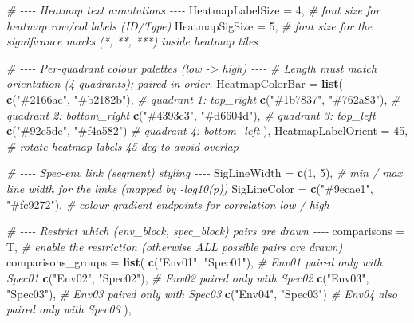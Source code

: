 \documentclass[
]{book}
\newenvironment{Shaded}{\begin{snugshade}}{\end{snugshade}}
\newcommand{\AttributeTok}[1]{\textcolor[rgb]{0.13,0.29,0.53}{#1}}
\newcommand{\CommentTok}[1]{\textcolor[rgb]{0.56,0.35,0.01}{\textit{#1}}}
\newcommand{\DecValTok}[1]{\textcolor[rgb]{0.00,0.00,0.81}{#1}}
\newcommand{\FunctionTok}[1]{\textcolor[rgb]{0.13,0.29,0.53}{\textbf{#1}}}
\newcommand{\NormalTok}[1]{#1}
\newcommand{\StringTok}[1]{\textcolor[rgb]{0.31,0.60,0.02}{#1}}
\begin{document}
\begin{Shaded}
\begin{Highlighting}[]
  \CommentTok{\# {-}{-}{-}{-} Heatmap text annotations {-}{-}{-}{-}}
  \AttributeTok{HeatmapLabelSize   =} \DecValTok{4}\NormalTok{,                    }\CommentTok{\# font size for heatmap row/col labels (ID/Type)}
  \AttributeTok{HeatmapSigSize     =} \DecValTok{5}\NormalTok{,                    }\CommentTok{\# font size for the significance marks (*, **, ***) inside heatmap tiles}

  \CommentTok{\# {-}{-}{-}{-} Per{-}quadrant colour palettes (low {-}\textgreater{} high) {-}{-}{-}{-}}
  \CommentTok{\# Length must match \textasciigrave{}orientation\textasciigrave{} (4 quadrants); paired in order.}
  \AttributeTok{HeatmapColorBar    =} \FunctionTok{list}\NormalTok{(}
    \FunctionTok{c}\NormalTok{(}\StringTok{"\#2166ac"}\NormalTok{, }\StringTok{"\#b2182b"}\NormalTok{),                 }\CommentTok{\# quadrant 1: top\_right}
    \FunctionTok{c}\NormalTok{(}\StringTok{"\#1b7837"}\NormalTok{, }\StringTok{"\#762a83"}\NormalTok{),                 }\CommentTok{\# quadrant 2: bottom\_right}
    \FunctionTok{c}\NormalTok{(}\StringTok{"\#4393c3"}\NormalTok{, }\StringTok{"\#d6604d"}\NormalTok{),                 }\CommentTok{\# quadrant 3: top\_left}
    \FunctionTok{c}\NormalTok{(}\StringTok{"\#92c5de"}\NormalTok{, }\StringTok{"\#f4a582"}\NormalTok{)                  }\CommentTok{\# quadrant 4: bottom\_left}
\NormalTok{  ),}
  \AttributeTok{HeatmapLabelOrient =} \DecValTok{45}\NormalTok{,                   }\CommentTok{\# rotate heatmap labels 45 deg to avoid overlap}

  \CommentTok{\# {-}{-}{-}{-} Spec{-}env link (segment) styling {-}{-}{-}{-}}
  \AttributeTok{SigLineWidth       =} \FunctionTok{c}\NormalTok{(}\DecValTok{1}\NormalTok{, }\DecValTok{5}\NormalTok{),              }\CommentTok{\# min / max line width for the links (mapped by {-}log10(p))}
  \AttributeTok{SigLineColor       =} \FunctionTok{c}\NormalTok{(}\StringTok{"\#9ecae1"}\NormalTok{, }\StringTok{"\#fc9272"}\NormalTok{),  }\CommentTok{\# colour gradient endpoints for correlation low / high}

  \CommentTok{\# {-}{-}{-}{-} Restrict which (env\_block, spec\_block) pairs are drawn {-}{-}{-}{-}}
  \AttributeTok{comparisons        =}\NormalTok{ T,                    }\CommentTok{\# enable the restriction (otherwise ALL possible pairs are drawn)}
  \AttributeTok{comparisons\_groups =} \FunctionTok{list}\NormalTok{(}
    \FunctionTok{c}\NormalTok{(}\StringTok{"Env01"}\NormalTok{, }\StringTok{"Spec01"}\NormalTok{),                    }\CommentTok{\# Env01 paired only with Spec01}
    \FunctionTok{c}\NormalTok{(}\StringTok{"Env02"}\NormalTok{, }\StringTok{"Spec02"}\NormalTok{),                    }\CommentTok{\# Env02 paired only with Spec02}
    \FunctionTok{c}\NormalTok{(}\StringTok{"Env03"}\NormalTok{, }\StringTok{"Spec03"}\NormalTok{),                    }\CommentTok{\# Env03 paired only with Spec03}
    \FunctionTok{c}\NormalTok{(}\StringTok{"Env04"}\NormalTok{, }\StringTok{"Spec03"}\NormalTok{)                     }\CommentTok{\# Env04 also paired only with Spec03}
\NormalTok{  ),}


\end{Highlighting}
\end{Shaded}
\end{document}
